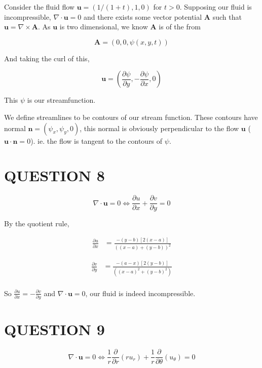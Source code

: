 \documentclass[a4paper]{article}
\begin{document}
Consider the fluid flow $ \mathbf{u} = (  1/(1+t),1,0 ) $ for $ t > 0 $. Supposing our fluid is incompressible, $ \nabla \cdot \mathbf{u} = 0 $ and there exists some vector potential $ \mathbf{A} $ such that $ \mathbf{u} = \nabla  \times \mathbf{A} $. As $ \mathbf{u} $ is two dimensional, we know $ \mathbf{A} $ is of the from

\[ \mathbf{A} = (0,0,\psi(x,y,t)) \]

And taking the curl of this, 

\[ \mathbf{u} = ( \frac{\partial \psi }{\partial y}, - \frac{\partial \psi }{\partial x}, 0 ) \]

This $ \psi $ is our streamfunction.

We define streamlines to be contours of our stream function. These contours have normal $ \mathbf{n} = ( \psi_{x},\psi_{y},0 ) $, this normal is obviously perpendicular to the flow $ \mathbf{u} $ ($ \mathbf{u} \cdot \mathbf{n} = 0 $). ie. the flow is tangent to the contours of $ \psi$. 

\section{QUESTION 8}

\[ \nabla \cdot \mathbf{u} = 0 \iff \frac{\partial u }{\partial x} + \frac{\partial v}{\partial y} = 0  \]

By the quotient rule,

\begin{align*}
\frac{\partial u }{\partial x}& = \frac{-(y-b)[2(x-a)]}{( (x-a) + (y-b))^{2}} 
\end{align*}

\begin{align*}
\frac{\partial v }{\partial y} & = \frac{-(a-x)[2(y-b)] }{( (x-a)^{2} + (y-b)^{2}   )} \\
\end{align*}

So $  \frac{\partial u }{\partial x} = - \frac{\partial v }{\partial y} $ and $  \nabla \cdot \mathbf{u} = 0 $, our fluid is indeed incompressible. 



\section{QUESTION 9}

\[ \nabla \cdot \mathbf{u} = 0 \iff  \frac{1}{r} \frac{\partial }{\partial r}(ru_{r}) + \frac{1}{r} \frac{\partial }{\partial \theta}(u_{\theta}) = 0  \]
\end{document}
